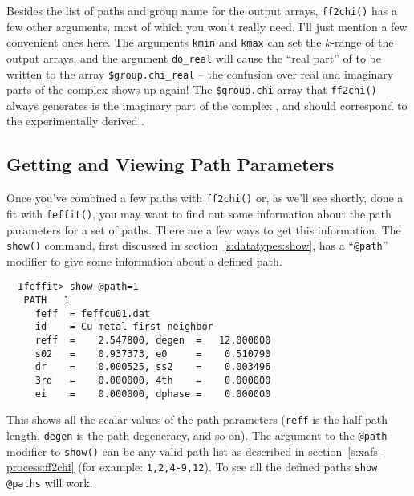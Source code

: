 \documentclass[11pt]{article}
\begin{document}
Besides the list of paths and group name for the output arrays,
{\tt{ff2chi()}} has a few other arguments, most of which you won't really
need.  I'll just mention a few convenient ones here. The arguments
{\tt{kmin}} and {\tt{kmax}} can set the $k$-range of the output arrays, and
the argument {\tt{do\_real}} will cause the ``real part'' of {\chik} to be
written to the array {\tt{\$group.chi\_real}} -- the confusion over real
and imaginary parts of the complex {\chik} shows up again!  The
{\tt{\$group.chi}} array that {\tt{ff2chi()}} always generates is the
imaginary part of the complex {\chik}, and should correspond to the
experimentally derived {\chik}.


\subsection{Getting and Viewing Path Parameters}\label{s:xafs-process:get_path}

Once you've combined a few paths with {\tt{ff2chi()}} or, as we'll see
shortly, done a fit with {\tt{feffit()}}, you may want to find out some
information about the path parameters for a set of paths.  There are a few
ways to get this information.  The {\tt{show()}} command, first discussed
in section~\ref{s:datatypes:show}, has a ``{\tt{@path}}'' modifier to give
some information about a defined path.
{\small\begin{verbatim}
  Ifeffit> show @path=1
   PATH   1
     feff  = feffcu01.dat
     id    = Cu metal first neighbor
     reff  =    2.547800, degen  =   12.000000
     s02   =    0.937373, e0     =    0.510790
     dr    =    0.000525, ss2    =    0.003496
     3rd   =    0.000000, 4th    =    0.000000
     ei    =    0.000000, dphase =    0.000000
\end{verbatim}}\noindent
This shows all the scalar values of the path parameters ({\tt{reff}} is
the half-path length, {\tt{degen}} is the path degeneracy, and so on).
The argument to the {\tt{@path}} modifier to {\tt{show()}}  can be any
valid path list as described in section~\ref{s:xafs-process:ff2chi}
(for example: {\tt{1,2,4-9,12}}).  To see all the defined paths
{\tt{show @paths}} will work.
\end{document}
